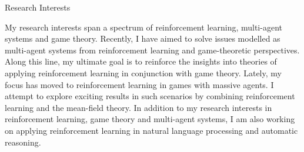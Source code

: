 \documentclass{resume} %
\begin{document}
\begin{rSection}{Research Interests}

My research interests span a spectrum of reinforcement learning, multi-agent systems and game theory. %
Recently, I have aimed to solve issues modelled as multi-agent systems from reinforcement learning and game-theoretic perspectives. Along this line, my ultimate goal is to reinforce the insights into theories of applying reinforcement learning in conjunction with game theory. Lately, my focus has moved to reinforcement learning in games with massive agents. I attempt to explore exciting results in such scenarios by combining reinforcement learning and the mean-field theory. In addition to my research interests in reinforcement learning, game theory and multi-agent systems, I am also working on applying reinforcement learning in natural language processing and automatic reasoning.

\end{rSection}
\end{document}
